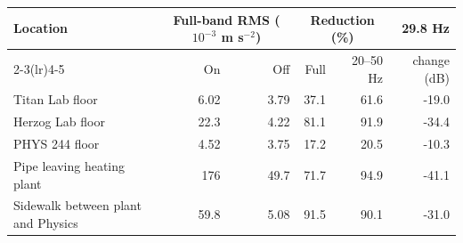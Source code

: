 \begin{tabular}{lrrrrr}
\toprule
Location & \multicolumn{2}{c}{Full-band RMS ($10^{-3}$ m s$^{-2}$)} & \multicolumn{2}{c}{Reduction (\%)} & 29.8 Hz \\
\cmidrule(lr){2-3}\cmidrule(lr){4-5}
 & On & Off & Full & 20--50 Hz & change (dB) \\
\midrule
Titan Lab floor & 6.02 & 3.79 & 37.1 & 61.6 & -19.0 \\
Herzog Lab floor & 22.3 & 4.22 & 81.1 & 91.9 & -34.4 \\
PHYS 244 floor & 4.52 & 3.75 & 17.2 & 20.5 & -10.3 \\
Pipe leaving heating plant & 176 & 49.7 & 71.7 & 94.9 & -41.1 \\
Sidewalk between plant and Physics & 59.8 & 5.08 & 91.5 & 90.1 & -31.0 \\
\bottomrule
\end{tabular}
